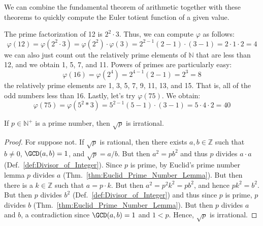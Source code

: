     We can combine the fundamental theorem of arithmetic together with
    these theorems to quickly compute the Euler totient function of a
    given value.
    \begin{example}
        The prime factorization of 12 is $2^{2}\cdot{3}$. Thus, we can
        compute $\varphi$ as follows:
        \begin{equation}
            \varphi(12)=\varphi(2^{2}\cdot{3})
                =\varphi(2^{2})\cdot\varphi(3)
                =2^{2-1}(2-1)\cdot(3-1)=2\cdot{1}\cdot{2}=4
        \end{equation}
        we can also just count out the relatively prime elements of
        $\mathbb{N}$ that are less than 12, and we obtain 1, 5, 7, and
        11. Powers of primes are particularly easy:
        \begin{equation}
            \varphi(16)=\varphi(2^{4})=2^{4-1}(2-1)=2^{3}=8
        \end{equation}
        the relatively prime elements are 1, 3, 5, 7, 9, 11, 13, and 15.
        That is, all of the odd numbers less than 16. Lastly, let's try
        $\varphi(75)$. We obtain:
        \begin{equation}
            \varphi(75)=\varphi(5^{2}*3)=5^{2-1}(5-1)\cdot(3-1)
                =5\cdot{4}\cdot{2}=40
        \end{equation}
    \end{example}
    \begin{theorem}
        \label{thm:SQRT_Primes_are_Irrational}%
        If $p\in\mathbb{N}^{+}$ is a prime number, then $\sqrt{p}$ is
        irrational.
    \end{theorem}
    \begin{proof}
        For suppose not. If $\sqrt{p}$ is rational, then there exists
        $a,b\in\mathbb{Z}$ such that $b\ne{0}$, $\GCD(a,b)=1$, and
        $\sqrt{p}=a/b$. But then $a^{2}=pb^{2}$ and thus $p$ divides
        $a\cdot{a}$ (Def.~\ref{def:Divisor_of_Integer}). Since $p$ is
        prime, by Euclid's prime number lemma $p$ divides $a$
        (Thm.~\ref{thm:Euclid_Prime_Number_Lemma}). But then there is a
        $k\in\mathbb{Z}$ such that $a=p\cdot{k}$. But then
        $a^{2}=p^{2}k^{2}=pb^{2}$, and hence $pk^{2}=b^{2}$. But then
        $p$ divides $b^{2}$ (Def.~\ref{def:Divisor_of_Integer}) and thus
        since $p$ is prime, $p$ divides $b$
        (Thm.~\ref{thm:Euclid_Prime_Number_Lemma}). But then $p$ divides
        $a$ and $b$, a contradiction since $\GCD(a,b)=1$ and $1<p$.
        Hence, $\sqrt{p}$ is irrational.
    \end{proof}
